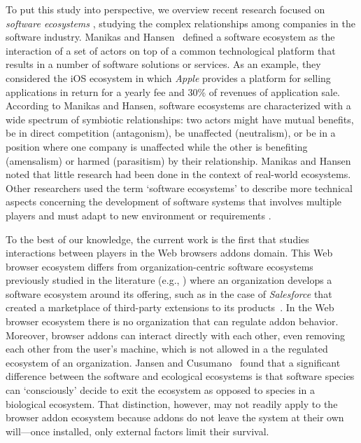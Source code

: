 \documentclass[10pt,letterpaper]{article}
\begin{document}
To put this study into perspective, we overview recent research focused on \textit{software ecosystems} \cite{messerschmitt2005software,dhungana2010software, manikas13,jansen13}, studying the complex relationships among companies in the software industry. Manikas and Hansen~\cite{manikas13} defined a software ecosystem as the interaction of a set of actors on top of a common technological platform that results in a number of software solutions or services. As an example, they considered the iOS ecosystem in which \textit{Apple} provides a platform for selling applications in return for a yearly fee and 30\% of revenues of application sale. According to Manikas and Hansen, software ecosystems are characterized with a wide spectrum of symbiotic relationships: two actors might have mutual benefits, be in direct competition (antagonism), be unaffected (neutralism), or be in a position where one company is unaffected while the other is benefiting (amensalism) or harmed (parasitism) by their relationship. Manikas and Hansen noted that little research had been done in the context of real-world ecosystems. Other researchers used the term `software ecosystems' to describe more technical aspects concerning the development of software systems that involves multiple players and must adapt to new environment or requirements \cite{lunguPhd09,blincoeMSR15}. 

To the best of our knowledge, the current work is the first that studies interactions between players in the Web browsers addons domain. This Web browser ecosystem differs from organization-centric software ecosystems previously studied in the literature (e.g., \cite{christensen2014analysis}) where an organization develops a software ecosystem around its offering, such as in the case of \textit{Salesforce} that created a marketplace of third-party extensions to its products~\cite{jansen2013defining}. In the Web browser ecosystem there is no organization that can regulate addon behavior. Moreover, browser addons can interact directly with each other, even removing each other from the user's machine, which is not allowed in a the regulated ecosystem of an organization. Jansen and Cusumano~\cite{jansen2013defining} found that a significant difference between the software and ecological ecosystems is that software species can `consciously' decide to exit the ecosystem as opposed to species in a biological ecosystem. That distinction, however, may not readily apply to the browser addon ecosystem because addons do not leave the system at their own will---once installed, only external factors limit their survival. 
\end{document}
